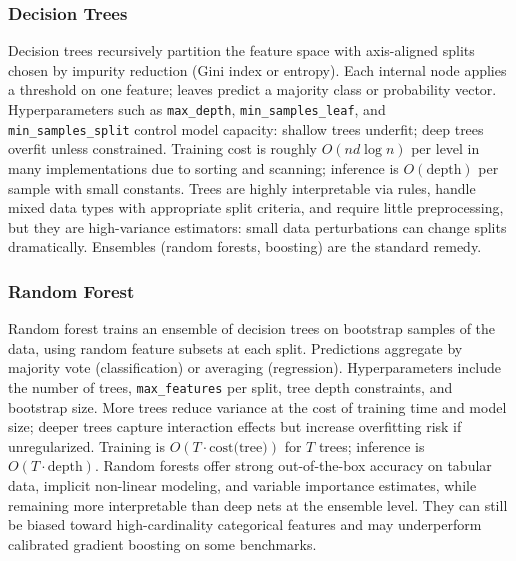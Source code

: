 \documentclass[11pt,a4paper]{article}
\begin{document}
\subsubsection{Decision Trees}
Decision trees recursively partition the feature space with axis-aligned splits chosen by impurity reduction (Gini index or entropy). Each internal node applies a threshold on one feature; leaves predict a majority class or probability vector. Hyperparameters such as \texttt{max\_depth}, \texttt{min\_samples\_leaf}, and \texttt{min\_samples\_split} control model capacity: shallow trees underfit; deep trees overfit unless constrained. Training cost is roughly $O(n d \log n)$ per level in many implementations due to sorting and scanning; inference is $O(\text{depth})$ per sample with small constants. Trees are highly interpretable via rules, handle mixed data types with appropriate split criteria, and require little preprocessing, but they are high-variance estimators: small data perturbations can change splits dramatically. Ensembles (random forests, boosting) are the standard remedy.

\subsubsection{Random Forest}
Random forest trains an ensemble of decision trees on bootstrap samples of the data, using random feature subsets at each split. Predictions aggregate by majority vote (classification) or averaging (regression). Hyperparameters include the number of trees, \texttt{max\_features} per split, tree depth constraints, and bootstrap size. More trees reduce variance at the cost of training time and model size; deeper trees capture interaction effects but increase overfitting risk if unregularized. Training is $O(T \cdot \text{cost(tree)})$ for $T$ trees; inference is $O(T \cdot \text{depth})$. Random forests offer strong out-of-the-box accuracy on tabular data, implicit non-linear modeling, and variable importance estimates, while remaining more interpretable than deep nets at the ensemble level. They can still be biased toward high-cardinality categorical features and may underperform calibrated gradient boosting on some benchmarks.
\end{document}
